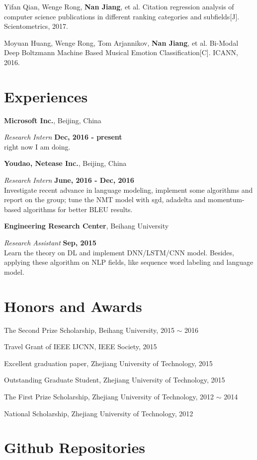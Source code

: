 \documentclass[margin,line]{resume}
\begin{document}
\begin{resume}
Yifan Qian, Wenge Rong, \textbf{Nan Jiang}, et al. Citation regression analysis of computer science publications in different ranking categories and subfields[J]. Scientometrics, 2017.

Moyuan Huang, Wenge Rong, Tom Arjannikov, \textbf{Nan Jiang}, et al. Bi-Modal Deep Boltzmann Machine Based Musical Emotion Classification[C]. ICANN, 2016.



\section{Experiences}
{\bf Microsoft Inc.}, Beijing, China

{\em Research Intern} \hfill {\bf Dec, 2016 - present}\\
right now I am doing.


{\bf Youdao, Netease Inc.}, Beijing, China

{\em Research Intern} \hfill {\bf June, 2016 - Dec, 2016}\\
Investigate recent advance in language modeling, implement some algorithms and report on the group; tune the NMT model with sgd, adadelta and momentum-based algorithms for better BLEU results.


{\bf Engineering Research Center}, Beihang University

{\em Research Assistant} \hfill {\bf Sep, 2015 }\\
Learn the theory on DL and implement DNN/LSTM/CNN model. Besides, applying these algorithm on NLP fields, like sequence word labeling and language model.



\section{Honors and Awards}

The Second Prize Scholarship, Beihang University, 2015 $\sim$ 2016

Travel Grant of IEEE IJCNN, IEEE Society, 2015

Excellent graduation paper, Zhejiang University of Technology, 2015

Outstanding Graduate Student, Zhejiang University of Technology, 2015

The First Prize Scholarship, Zhejiang University of Technology, 2012 $\sim$ 2014

National Scholarship, Zhejiang University of Technology, 2012

\section{Github Repositories}


\end{resume}
\end{document}
